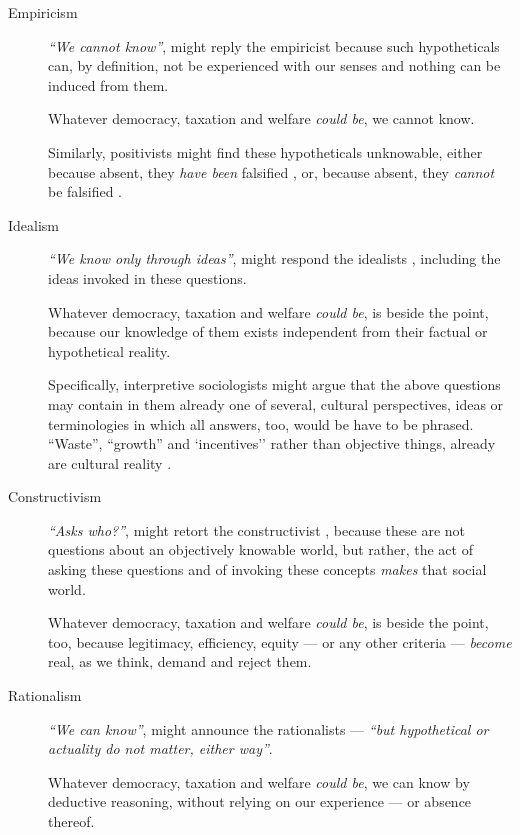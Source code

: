 \begin{description}
	\item[Empiricism]
		\label{itm:empiricism}
	\emph{``We cannot know''}, might reply the empiricist \citep{Bacon1620,Locke1689,Hume1739} because such hypotheticals can, by definition, not be experienced with our senses and nothing can be induced from them.

	Whatever democracy, taxation and welfare \emph{could be}, we cannot know.

	Similarly, positivists might find these hypotheticals unknowable, either because absent, they \emph{have been} falsified \citep{Comte1842,Durkheim1895}, or, because absent, they \emph{cannot} be falsified \citep{Popper1934}.

	\item[Idealism]
		\label{itm:idealism}
	\emph{``We know only through ideas''}, might respond the idealists \citep[broadly][]{Kant1781,Hegel1807}, including the ideas invoked in these questions.

	Whatever democracy, taxation and welfare \emph{could be}, is beside the point, because our knowledge of them exists independent from their factual or hypothetical reality.

	Specifically, interpretive sociologists \citep{Weber1897} might argue that the above questions may contain in them already one of several, cultural perspectives, ideas or terminologies in which all answers, too, would be have to be phrased.
	``Waste'', ``growth'' and `incentives'' rather than objective things, already are cultural reality \citep[compare][]{Beland2010}.

	\item[Constructivism]
		\label{itm:constructivism}
	\emph{``Asks \emph{who}?''}, might retort the constructivist \citep{Berger1966,Paul1984}, because these are not questions about an objectively knowable world, but rather, the act of asking these questions and of invoking these concepts \emph{makes} that social world.

	Whatever democracy, taxation and welfare \emph{could be}, is beside the point, too, because legitimacy, efficiency, equity --- or any other criteria --- \emph{become} real, as we think, demand and reject them.

	\item[Rationalism]
		\label{itm:rationalism}
	\emph{``We can know''}, might announce the rationalists \citep{Descartes1637,Spinoza1662,Leibniz1704} --- \emph{``but hypothetical or actuality do not matter, either way''}.

	Whatever democracy, taxation and welfare \emph{could be}, we can know by deductive reasoning, without relying on our experience --- or absence thereof.
\end{description}

